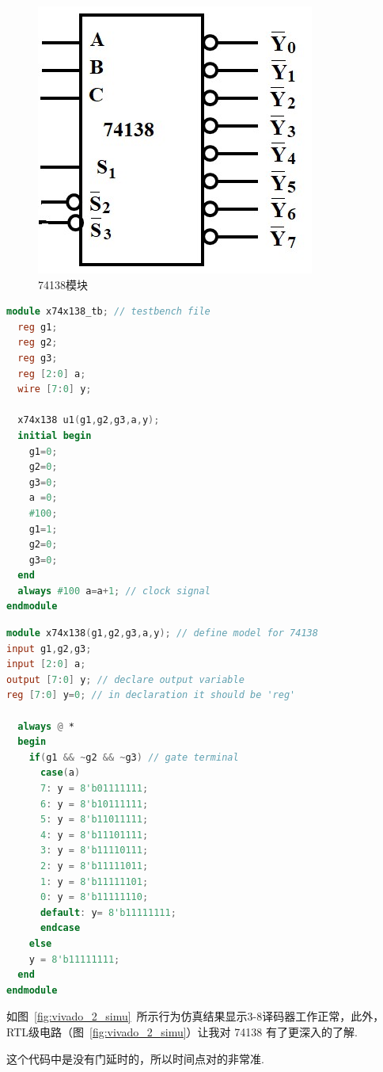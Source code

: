 \documentclass[11pt]{SEU-Digital-Report}
\begin{document}
                \begin{figure}[htbp]
                    \centering
                    \includegraphics[width=.25\linewidth]{fig/74138.jpg}
                    \caption{74138模块\cite{guide}}
                    \label{fig:74138}
                \end{figure}

                \begin{lstlisting}[language=verilog, title=x74x138\_tb.v]
module x74x138_tb; // testbench file
  reg g1; 
  reg g2; 
  reg g3; 
  reg [2:0] a; 
  wire [7:0] y; 
 
  x74x138 u1(g1,g2,g3,a,y); 
  initial begin 
    g1=0; 
    g2=0; 
    g3=0; 
    a =0; 
    #100;
    g1=1; 
    g2=0; 
    g3=0; 
  end 
  always #100 a=a+1; // clock signal
endmodule
                \end{lstlisting}
                \begin{lstlisting}[language=verilog, title=x74x138.v]
module x74x138(g1,g2,g3,a,y); // define model for 74138
input g1,g2,g3; 
input [2:0] a; 
output [7:0] y; // declare output variable
reg [7:0] y=0; // in declaration it should be 'reg'
 
  always @ * 
  begin 
    if(g1 && ~g2 && ~g3) // gate terminal
      case(a) 
      7: y = 8'b01111111; 
      6: y = 8'b10111111; 
      5: y = 8'b11011111; 
      4: y = 8'b11101111; 
      3: y = 8'b11110111; 
      2: y = 8'b11111011; 
      1: y = 8'b11111101; 
      0: y = 8'b11111110; 
      default: y= 8'b11111111; 
      endcase 
    else 
    y = 8'b11111111; 
  end 
endmodule
                \end{lstlisting}

            \begin{analyze}{}{}
                如图~\ref{fig:vivado_2_simu}~所示行为仿真结果显示3-8译码器工作正常，此外，RTL级电路（图~\ref{fig:vivado_2_simu}）让我对 74138 有了更深入的了解.

                这个代码中是没有门延时的，所以时间点对的非常准.
            \end{analyze}
\end{document}
